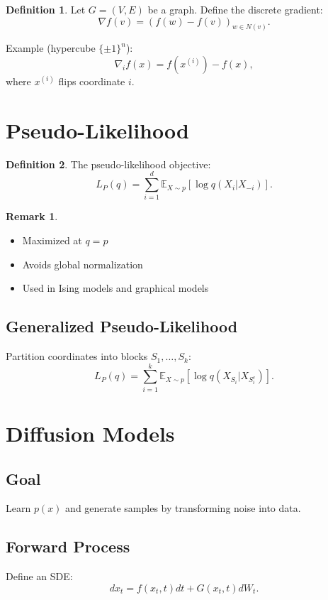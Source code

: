 \documentclass[12pt,oneside]{book}
\numberwithin{equation}{section}
\theoremstyle{definition}
\newtheorem{definition}{Definition}[section]
\newtheorem{remark}{Remark}[section]
\theoremstyle{plain}
\theoremstyle{remark}
\newcommand{\E}{\mathbb{E}}
\begin{document}
\begin{definition}
Let $G=(V,E)$ be a graph. Define the discrete gradient:
\[
\nabla f(v) = (f(w) - f(v))_{w \in N(v)}.
\]
\end{definition}

Example (hypercube $\{\pm1\}^n$):
\[
\nabla_i f(x) = f(x^{(i)}) - f(x),
\]
where $x^{(i)}$ flips coordinate $i$.

\section{Pseudo-Likelihood}

\begin{definition}
The pseudo-likelihood objective:
\[
L_P(q) = \sum_{i=1}^d \E_{X \sim p}[\log q(X_i | X_{-i})].
\]
\end{definition}

\begin{remark}
\begin{itemize}
    \item Maximized at $q=p$
    \item Avoids global normalization
    \item Used in Ising models and graphical models
\end{itemize}
\end{remark}

\subsection{Generalized Pseudo-Likelihood}

Partition coordinates into blocks $S_1,\dots,S_k$:
\[
L_P(q) = \sum_{i=1}^k \E_{X \sim p}[\log q(X_{S_i} | X_{S_i^c})].
\]

\section{Diffusion Models}

\subsection{Goal}

Learn $p(x)$ and generate samples by transforming noise into data.

\subsection{Forward Process}

Define an SDE:
\[
dx_t = f(x_t,t) dt + G(x_t,t) dW_t.
\]
\end{document}
